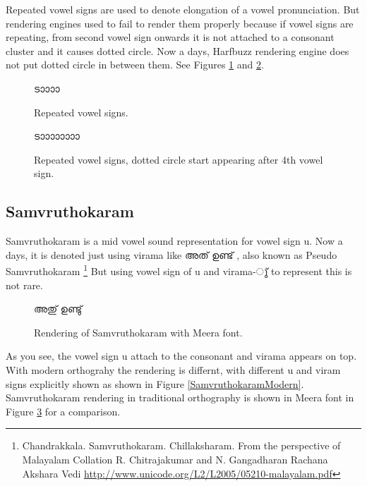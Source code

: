 Repeated vowel signs are used to denote elongation of a vowel pronunciation. But rendering engines used to fail to render them properly because if vowel signs are repeating, from second vowel sign onwards it is not attached to a consonant cluster and it causes dotted circle. Now a days, Harfbuzz rendering engine does not put dotted circle in between them. See Figures \ref{elongatedvowel-dotted} and \ref{elongated-nodotted}.

\begin{figure}[h]
  \centering
  {\meera\textexample ടാാാാ}\\
  \caption{Repeated vowel signs.}
  \label{elongatedvowel-dotted}
\end{figure}

\begin{figure}[h]
  \centering
  {\meera\textexample ടാാാാാാാാ}\\
  \caption{Repeated vowel signs, dotted circle start appearing after 4th vowel sign.}
  \label{elongated-nodotted}
\end{figure}


\subsection {Samvruthokaram}
\label{Samvruthokaram}
Samvruthokaram is a mid vowel sound representation for vowel sign u. Now a 
days, it is denoted just using virama like {\malayalam അത് ഉണ്ട് }, also known as 
Pseudo Samvruthokaram
\footnote{Chandrakkala. Samvruthokaram. Chillaksharam.
From the perspective of Malayalam Collation
R. Chitrajakumar and N. Gangadharan
Rachana Akshara Vedi \url{http://www.unicode.org/L2/L2005/05210-malayalam.pdf}}
But using vowel sign of u and virama-{\malayalam ു്} to represent this is not 
rare.

\begin{figure}[h!]
  \centering
  {\meera\textexample  അതു് ഉണ്ടു് }\\
  \caption{Rendering of Samvruthokaram with Meera font.}
  \label{SamvruthokaramTraditional}
\end{figure}

As you see, the vowel sign u attach to the consonant and virama appears on top.
With modern orthograhy the rendering is differnt, with different u and viram 
signs explicitly shown as shown in Figure \ref{SamvruthokaramModern}. Samvruthokaram rendering in traditional orthography is shown in Meera font in Figure \ref{SamvruthokaramTraditional} for a comparison.

